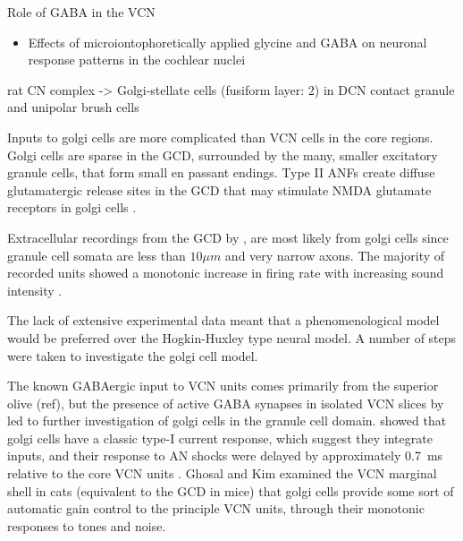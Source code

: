 Role of GABA in the VCN
\begin{itemize}
\item Effects of microiontophoretically applied glycine and {GABA} on
  neuronal response patterns in the cochlear nuclei
  \citep{CasparyHaveyEtAl:1979}
\end{itemize}

\citep{Alibardi:2003a} rat CN complex -> Golgi-stellate cells
(fusiform layer: 2) in DCN contact granule and unipolar brush cells


Inputs to golgi cells are more complicated than VCN cells in the core
regions. Golgi cells are sparse in the GCD, surrounded by the many,
smaller excitatory granule cells, that form small en passant
endings. Type II ANFs create diffuse glutamatergic release sites in
the GCD \citep{HurdHutsonEtAl:1999,BensonBrown:2004} that may
stimulate NMDA glutamate receptors in golgi cells
\citep{FerragamoGoldingEtAl:1998a}.


Extracellular recordings from the GCD by \citet{GhoshalKim:1997}, are most likely from golgi
cells since granule cell somata are less than  $10 \mu m$ and very
narrow axons. The majority of recorded
units showed a monotonic increase in firing rate with increasing sound
intensity \citep{GhoshalKim:1997}. 


\medskip{}

The lack of extensive experimental data meant that a phenomenological model
would be preferred over the Hogkin-Huxley type neural model. A number of steps
were taken to investigate the golgi cell model.

The known GABAergic input to VCN units comes primarily from the superior olive
(ref), but the presence of active GABA synapses in isolated VCN slices by
\citet{FerragamoGoldingEtAl:1998} led to further investigation of
golgi cells in the granule cell domain. \citet{FerragamoGoldingEtAl:1998a}
showed that golgi cells have a classic type-I current
response, which suggest they integrate inputs, and their response to
AN shocks were delayed by approximately 0.7~ms relative to the core
VCN units .  Ghosal and Kim
\citet{GhoshalKim:1997} examined the VCN marginal shell in cats (equivalent to the
GCD in mice) that golgi cells provide some sort of
automatic gain control to the principle VCN units, through their monotonic
responses to tones and noise.

\medskip{}

   

